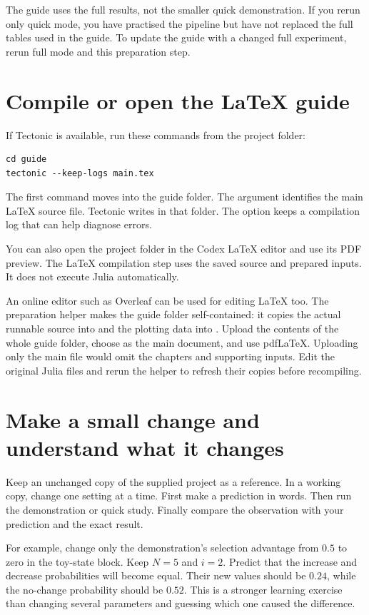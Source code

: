 The guide uses the full results, not the smaller quick demonstration. If
you rerun only quick mode, you have practised the pipeline but have not
replaced the full tables used in the guide. To update the guide with a
changed full experiment, rerun full mode and this preparation step.

\section{Compile or open the LaTeX guide}

If Tectonic is available, run these commands from the project folder:
\begin{lstlisting}[language={},numbers=none]
cd guide
tectonic --keep-logs main.tex
\end{lstlisting}
The first command moves into the guide folder. The argument 
identifies the main LaTeX source file. Tectonic writes  in that
folder. The option keeps a compilation log that can help diagnose errors.

You can also open the  project folder in the Codex LaTeX
editor and use its PDF preview. The LaTeX compilation step uses the saved
source and prepared inputs. It does not execute Julia automatically.

An online editor such as Overleaf can be used for editing LaTeX too. The
preparation helper makes the guide folder self-contained: it copies the actual
runnable source into  and the plotting data into
. Upload the contents of the whole guide folder, choose
 as the main document, and use pdfLaTeX. Uploading only the main
file would omit the chapters and supporting inputs. Edit the original Julia
files and rerun the helper to refresh their copies before recompiling.

\section{Make a small change and understand what it changes}

Keep an unchanged copy of the supplied project as a reference. In a working
copy, change one setting at a time. First make a prediction in words. Then
run the demonstration or quick study. Finally compare the observation with
your prediction and the exact result.

For example, change only the demonstration's selection advantage from
\(0.5\) to zero in the toy-state block. Keep \(N=5\) and \(i=2\).
Predict that the increase and decrease probabilities will become equal.
Their new values should be \(0.24\), while the no-change probability
should be \(0.52\). This is a stronger learning exercise than changing
several parameters and guessing which one caused the difference.

